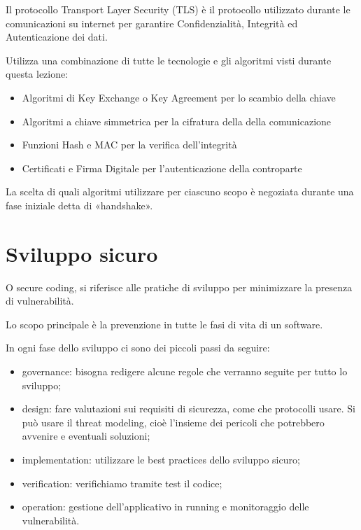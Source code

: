 Il protocollo Transport Layer Security (TLS) è il protocollo utilizzato
durante le comunicazioni su internet per garantire Confidenzialità,
Integrità ed Autenticazione dei dati.

Utilizza una combinazione di tutte le tecnologie e gli algoritmi visti
durante questa lezione:

\begin{itemize}
\item
  Algoritmi di Key Exchange o Key Agreement per lo scambio della chiave
\item
  Algoritmi a chiave simmetrica per la cifratura della della
  comunicazione
\item
  Funzioni Hash e MAC per la verifica dell'integrità
\item
  Certificati e Firma Digitale per l'autenticazione della controparte
\end{itemize}

La scelta di quali algoritmi utilizzare per ciascuno scopo è negoziata
durante una fase iniziale detta di «handshake».

\section{Sviluppo sicuro}\label{sviluppo-sicuro}

O secure coding, si riferisce alle pratiche di sviluppo per minimizzare
la presenza di vulnerabilità.

Lo scopo principale è la prevenzione in tutte le fasi di vita di un
software.

In ogni fase dello sviluppo ci sono dei piccoli passi da seguire:

\begin{itemize}
\item
  governance: bisogna redigere alcune regole che verranno seguite per
  tutto lo sviluppo;
\item
  design: fare valutazioni sui requisiti di sicurezza, come che
  protocolli usare. Si può usare il threat modeling, cioè l'insieme dei
  pericoli che potrebbero avvenire e eventuali soluzioni;
\item
  implementation: utilizzare le best practices dello sviluppo sicuro;
\item
  verification: verifichiamo tramite test il codice;
\item
  operation: gestione dell'applicativo in running e monitoraggio delle
  vulnerabilità.
\end{itemize}

